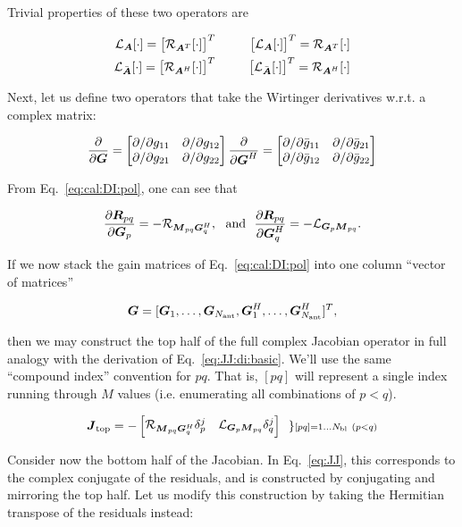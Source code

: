 \documentclass[useAMS,usenatbib]{mn2e}
\newcommand{\mat}[1]{{\bmath{#1}}}
\newcommand{\JJ}{\mat{J}} %
\newcommand{\MM}{\mat{M}}
\newcommand{\RR}{\mat{R}}
\newcommand{\GG}{\mat{G}}
\begin{document}
Trivial properties of these two operators are 

\begin{eqnarray}
\label{eq:LA:RATT}
\Lop{\mat{A}}[\cdot] = \big[ \Rop{\mat{A}^T}[\cdot] \big ]^T~~&~&~~
\big[ \Lop{\mat{A}}[\cdot] \big]^T = \Rop{\mat{A}^T}[\cdot] \nonumber\\
\Lop{\bar{\mat{A}}}[\cdot] = \big[ \Rop{\mat{A}^H}[\cdot] \big ]^T~~&~&~~
\big[ \Lop{\bar{\mat{A}}}[\cdot] \big]^T = \Rop{\mat{A}^H}[\cdot]
\end{eqnarray}

Next, let us define two operators that take the Wirtinger derivatives w.r.t. a complex matrix:

\begin{equation}
\frac{\partial}{\partial\GG} = \Matrix{cc}{ {\partial}/{\partial g_{11}} & {\partial}/{\partial g_{12}} \\
{\partial}/{\partial g_{21}} & {\partial}/{\partial g_{22}}} \\
\frac{\partial}{\partial{\GG^H}} = \Matrix{cc}{ {\partial}/{\partial \bar{g}_{11}} & {\partial}/{\partial \bar{g}_{21}} \\
{\partial}/{\partial \bar{g}_{12}} & {\partial}/{\partial \bar{g}_{22}}}
\end{equation}

From Eq.~\ref{eq:cal:DI:pol}, one can see that

\[
\frac{\partial\RR_{pq}}{\partial\GG_p} = -\Rop{\MM_{pq}\GG^H_q},\mathrm{~~and~~}
\frac{\partial\RR_{pq}}{\partial\GG^H_q} = -\Lop{\GG_p \MM_{pq}}.
\]

If we now stack the gain matrices of Eq.~\ref{eq:cal:DI:pol} into one column ``vector of matrices'' 

\[
\GG = [ \GG_1,\dots,\GG_{\scriptstyle \Na},\GG^H_1,\dots,\GG^H_{\scriptstyle \Na} ]^T,
\]

then we may construct the top half of the full complex Jacobian operator in full analogy with the 
derivation of Eq.~\ref{eq:JJ:di:basic}. We'll use the same ``compound index'' convention for $pq$. That is, 
$[pq]$ will represent a single index running through $M$ values (i.e. enumerating all combinations of $p<q$).

\[
\JJ_\mathrm{top} = - \Matrix{cc}{ 
\Rop{ \MM_{pq}\GG^H_q }\delta^j_p & 
\Lop{ \GG_p \MM_{pq}  }\delta^j_q 
} ~~ \} \scriptstyle [pq]=1\dots \Nbl~(p<q)
% 
\]

Consider now the bottom half of the Jacobian. In Eq.~\ref{eq:JJ}, this corresponds to the complex conjugate of the residuals, 
and is constructed by conjugating and mirroring the top half. Let us modify this construction by taking the Hermitian transpose 
of the residuals instead:
\end{document}
